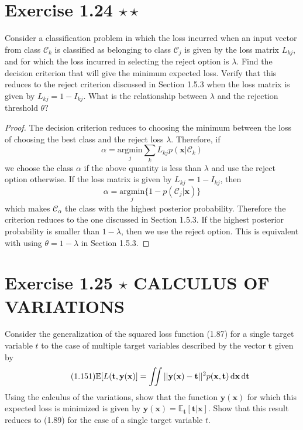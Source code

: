 \section*{Exercise 1.24 $\star \star$}
Consider a classification problem in which the loss incurred
when an input vector from class $\mathcal{C}_k$ is classified
as belonging to class $\mathcal{C}_j$ is given by the
loss matrix $L_{kj}$, and for which the loss incurred in
selecting the reject option is $\lambda$. Find the decision
criterion that will give the minimum expected loss. Verify
that this reduces to the reject criterion discussed in Section
1.5.3 when the loss matrix is given by $L_{kj} = 1 - I_{kj}$.
What is the relationship between $\lambda$ and the rejection
threshold $\theta$?

\vspace{1em}

\begin{proof}
    The decision criterion reduces to choosing the minimum between the loss
    of choosing the best class and the reject loss $\lambda$. Therefore, if
    \[
        \alpha = \underset{j}{\mathrm{argmin}} \sum_k L_{kj}p(\mathbf{x} | \mathcal{C}_k)
    \] 
    we choose the class $\alpha$ if the above quantity is less than $\lambda$ 
    and use the reject option otherwise. If the loss matrix is given
    by $L_{kj} = 1 - I_{kj}$, then 
    \[
        \alpha = \underset{j}{\mathrm{argmin}} \{1 - p(\mathcal{C}_j | \mathbf{x})\}
    \] 
    which makes $\mathcal{C}_{\alpha}$ the class with the highest posterior probability.
    Therefore the criterion reduces to the one discussed in Section 1.5.3.
    If the highest posterior probability is smaller than $1 - \lambda$, then
    we use the reject option. This is equivalent with using $\theta = 1 - \lambda$
    in Section 1.5.3.
\end{proof}

\section*{Exercise 1.25 $\star$ CALCULUS OF VARIATIONS}
Consider the generalization of the squared loss function (1.87) for
a single target variable $t$ to the case of multiple target variables
described by the vector $\mathbf{t}$ given by
\begin{equation}\label{eq:1.151}\tag{1.151}
    \mathbb{E}[L(\mathbf{t}, \mathbf{y}(\mathbf{x})] 
    = \iint ||\mathbf{y}(\mathbf{x}) - \mathbf{t}||^2 p(\mathbf{x}, \mathbf{t}) 
    \mathop{}\!\mathrm{d} \mathbf{x} \mathop{}\!\mathrm{d} \mathbf{t}
\end{equation}
Using the calculus of the variations, show that the function $\mathbf{y}(\mathbf{x})$ for
which this expected loss is minimized is given by 
$\mathbf{y}(\mathbf{x}) = \mathbb{E}_{\mathbf{t}}[\mathbf{t}|\mathbf{x}]$. 
Show that this result reduces to (1.89) for the case of a single target variable $t$. 

